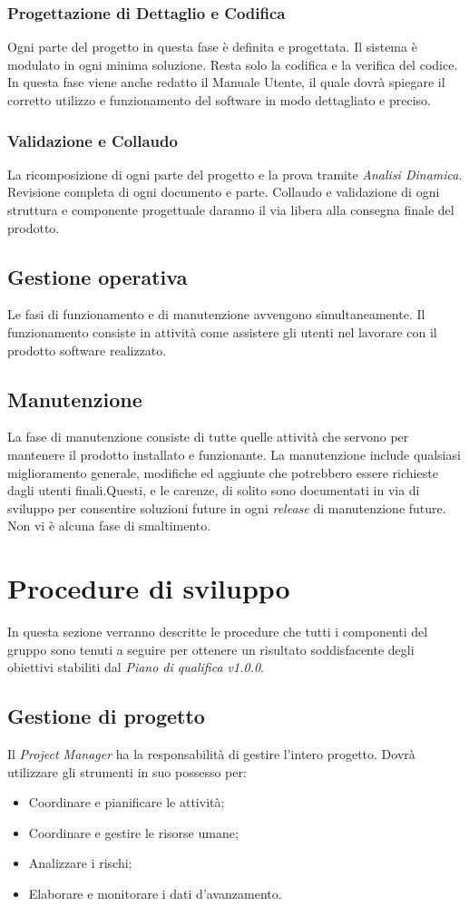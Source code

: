 \documentclass[12pt,a4paper,titlepage]{article}
\begin{document}
\subsubsection{Progettazione di Dettaglio e Codifica}
Ogni parte del progetto in questa fase è definita e progettata. Il sistema è modulato in ogni minima soluzione. Resta solo la codifica e la verifica del codice. In questa fase viene anche redatto il Manuale Utente, il quale dovrà spiegare il corretto utilizzo e funzionamento del software in modo dettagliato e preciso.
\subsubsection{Validazione e Collaudo}
La ricomposizione di ogni parte del progetto e la prova tramite \textit{Analisi Dinamica}. Revisione completa di ogni documento e parte. Collaudo e validazione di ogni struttura e componente progettuale daranno il via libera alla consegna finale del prodotto.
\subsection {Gestione operativa}
Le fasi di funzionamento e di manutenzione avvengono simultaneamente.
Il funzionamento consiste in attività come assistere gli utenti nel lavorare con il prodotto software realizzato.
\subsection {Manutenzione}
La fase di manutenzione consiste di tutte quelle attività che servono per mantenere il prodotto installato e funzionante. La manutenzione include qualsiasi miglioramento generale, modifiche ed aggiunte che potrebbero essere richieste dagli utenti finali.Questi, e le carenze, di solito sono documentati in via di sviluppo per consentire soluzioni future in ogni \textit{release} di manutenzione future. Non vi è alcuna fase di smaltimento.
\newpage
{}
\section{Procedure di sviluppo}
In questa sezione verranno descritte le procedure che tutti i componenti del gruppo sono tenuti a seguire
per ottenere un risultato soddisfacente degli obiettivi stabiliti dal \textit{Piano di qualifica v1.0.0}.
\subsection{Gestione di progetto}
Il \textit{Project Manager} ha la responsabilità di gestire l'intero progetto. Dovrà utilizzare gli
strumenti in suo possesso per:
\begin{itemize}
	\item Coordinare e pianificare le attività;
	\item Coordinare e gestire le risorse umane;
	\item Analizzare i rischi;
	\item Elaborare e monitorare i dati d'avanzamento.
\end{itemize}
\end{document}

